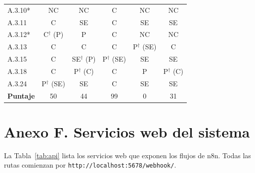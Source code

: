 \documentclass[12pt,letterpaper]{article}
\begin{document}
\begin{small}
\begin{longtable}{@{}l c c c c c@{}}
A.3.10* & NC & NC & C & NC & NC \\
A.3.11 & C & SE & C & SE & SE \\
A.3.12* & C$^\dagger$ (P) & P & C & NC & NC \\
A.3.13 & C & C & C & P$^\dagger$ (SE) & C \\
A.3.15 & C & SE$^\dagger$ (P) & P$^\dagger$ (SE) & SE & SE \\
A.3.18 & C & P$^\dagger$ (C) & C & P & P$^\dagger$ (C) \\
A.3.24 & P$^\dagger$ (SE) & SE & C & SE & SE \\
\midrule
\textbf{Puntaje} & 50 & 44 & 99 & 0 & 31 \\
\end{longtable}
\end{small}

\newpage
\section{Anexo F. Servicios web del sistema}
\label{anx:api}

La Tabla~\ref{tab:api} lista los servicios web que exponen los flujos de n8n. Todas las rutas comienzan por \texttt{http://localhost:5678/webhook/}.
\end{document}
